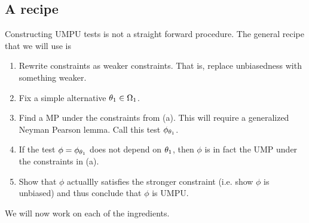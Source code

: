 \subsection{A recipe}
Constructing UMPU tests is not a straight forward procedure. The general recipe that we will use is
\begin{enumerate}
    \item Rewrite constraints as weaker constraints. That is, replace unbiasedness with something weaker.
    \item Fix a simple alternative ${\theta}_1 \in {{\Omega}}_1$.
    \item Find a MP under the constraints from (a). This will require a generalized Neyman Pearson lemma. Call this test $\phi_{{\theta}_1}$.
    \item If the test $\phi = \phi_{{\theta}_1}$ does not depend on ${\theta}_1$, then $\phi$ is in fact the UMP under the constraints in (a).
    \item Show that $\phi$ actuallly satisfies the stronger constraint (i.e. show $\phi$ is unbiased) and thus conclude that $\phi$ is UMPU.
\end{enumerate}
We will now work on each of the ingredients.
